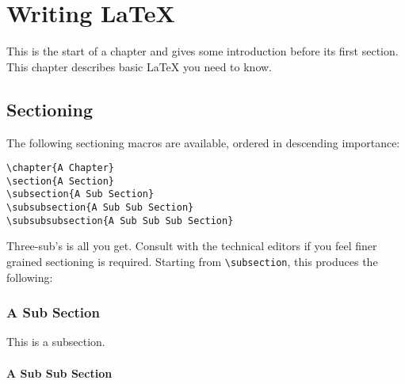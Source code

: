 
\chapter{Writing \LaTeX}

This is the start of a chapter and gives some introduction before its first section.  This chapter describes basic \LaTeX{} you need to know.

\section{Sectioning}
\label{sec:sectioning}

The following sectioning macros are available, ordered in descending
importance:

\begin{verbatim}
\chapter{A Chapter}
\section{A Section}
\subsection{A Sub Section}
\subsubsection{A Sub Sub Section}
\subsubsubsection{A Sub Sub Sub Section}
\end{verbatim}

Three-sub's is all you get.  
Consult with the technical editors if you feel finer grained
sectioning is required.
Starting from \verb|\subsection|, this produces the following:

\subsection{A Sub Section}

This is a subsection.

\subsubsection{A Sub Sub Section}

